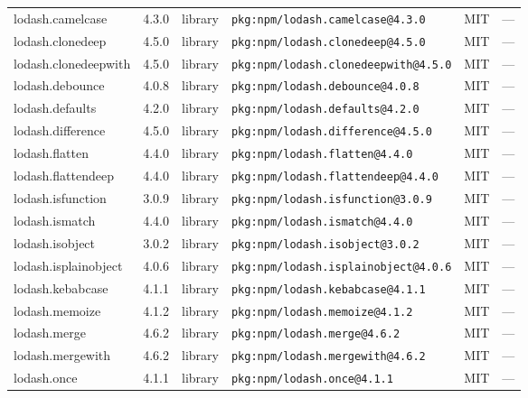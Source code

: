 \documentclass[11pt,a4paper]{article}
\begin{document}
\begin{longtable}{|p{4cm}|p{2cm}|p{1.6cm}|p{5cm}|p{1.5cm}|p{3.5cm}|}
\raggedright lodash.camelcase & 4.3.0 & library & \small\texttt{pkg:npm/lodash.camelcase@4.3.0} & MIT & \small — \\
\raggedright lodash.clonedeep & 4.5.0 & library & \small\texttt{pkg:npm/lodash.clonedeep@4.5.0} & MIT & \small — \\
\raggedright lodash.clonedeepwith & 4.5.0 & library & \small\texttt{pkg:npm/lodash.clonedeepwith@4.5.0} & MIT & \small — \\
\raggedright lodash.debounce & 4.0.8 & library & \small\texttt{pkg:npm/lodash.debounce@4.0.8} & MIT & \small — \\
\raggedright lodash.defaults & 4.2.0 & library & \small\texttt{pkg:npm/lodash.defaults@4.2.0} & MIT & \small — \\
\raggedright lodash.difference & 4.5.0 & library & \small\texttt{pkg:npm/lodash.difference@4.5.0} & MIT & \small — \\
\raggedright lodash.flatten & 4.4.0 & library & \small\texttt{pkg:npm/lodash.flatten@4.4.0} & MIT & \small — \\
\raggedright lodash.flattendeep & 4.4.0 & library & \small\texttt{pkg:npm/lodash.flattendeep@4.4.0} & MIT & \small — \\
\raggedright lodash.isfunction & 3.0.9 & library & \small\texttt{pkg:npm/lodash.isfunction@3.0.9} & MIT & \small — \\
\raggedright lodash.ismatch & 4.4.0 & library & \small\texttt{pkg:npm/lodash.ismatch@4.4.0} & MIT & \small — \\
\raggedright lodash.isobject & 3.0.2 & library & \small\texttt{pkg:npm/lodash.isobject@3.0.2} & MIT & \small — \\
\raggedright lodash.isplainobject & 4.0.6 & library & \small\texttt{pkg:npm/lodash.isplainobject@4.0.6} & MIT & \small — \\
\raggedright lodash.kebabcase & 4.1.1 & library & \small\texttt{pkg:npm/lodash.kebabcase@4.1.1} & MIT & \small — \\
\raggedright lodash.memoize & 4.1.2 & library & \small\texttt{pkg:npm/lodash.memoize@4.1.2} & MIT & \small — \\
\raggedright lodash.merge & 4.6.2 & library & \small\texttt{pkg:npm/lodash.merge@4.6.2} & MIT & \small — \\
\raggedright lodash.mergewith & 4.6.2 & library & \small\texttt{pkg:npm/lodash.mergewith@4.6.2} & MIT & \small — \\
\raggedright lodash.once & 4.1.1 & library & \small\texttt{pkg:npm/lodash.once@4.1.1} & MIT & \small — \\

\end{longtable}
\end{document}
